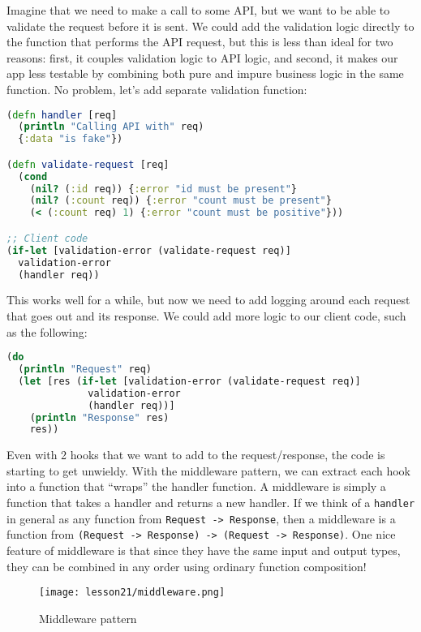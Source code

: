 \documentclass[10pt,twoside,openright]{memoir}
\begin{document}
Imagine that we need to make a call to some API, but we want to be able
to validate the request before it is sent. We could add the validation
logic directly to the function that performs the API request, but this
is less than ideal for two reasons: first, it couples validation logic
to API logic, and second, it makes our app less testable by combining
both pure and impure business logic in the same function. No problem,
let's add separate validation function:

\begin{lstlisting}[language=Clojure]
(defn handler [req]
  (println "Calling API with" req)
  {:data "is fake"})

(defn validate-request [req]
  (cond
    (nil? (:id req)) {:error "id must be present"}
    (nil? (:count req)) {:error "count must be present"}
    (< (:count req) 1) {:error "count must be positive"}))

;; Client code
(if-let [validation-error (validate-request req)]
  validation-error
  (handler req))
\end{lstlisting}

This works well for a while, but now we need to add logging around each
request that goes out and its response. We could add more logic to our
client code, such as the following:

\begin{lstlisting}[language=Clojure]
(do
  (println "Request" req)
  (let [res (if-let [validation-error (validate-request req)]
              validation-error
              (handler req))]
    (println "Response" res)
    res))
\end{lstlisting}

Even with 2 hooks that we want to add to the request/response, the code
is starting to get unwieldy. With the middleware pattern, we can
extract each hook into a function that ``wraps'' the handler function. A
middleware is simply a function that takes a handler and returns a new
handler. If we think of a \texttt{handler} in general as any function
from \texttt{Request\ -\textgreater{}\ Response}, then a middleware is a
function from
\texttt{(Request\ -\textgreater{}\ Response)\ -\textgreater{}\ (Request\ -\textgreater{}\ Response)}.
One nice feature of middleware is that since they have the same input
and output types, they can be combined in any order using ordinary
function composition!

\begin{figure}[H]
\caption{Middleware pattern}
\centering
\texttt{[image: lesson21/middleware.png]}
\end{figure}
\end{document}
